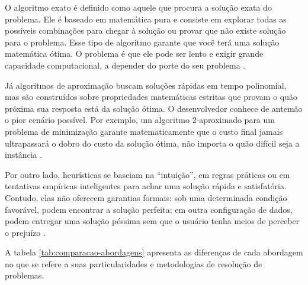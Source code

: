 O algoritmo exato é definido como aquele que procura a solução exata do problema. Ele é baseado em matemática pura e consiste em explorar todas as possíveis combinações para chegar à solução ou provar que não existe solução para o problema. Esse tipo de algoritmo garante que você terá uma solução matemática ótima. O problema é que ele pode ser lento e exigir grande capacidade computacional, a depender do porte do seu problema \cite{wikipedia_exact_alg}.

Já algoritmos de aproximação buscam soluções rápidas em tempo polinomial, mas são construídos sobre propriedades matemáticas estritas que provam o quão próxima sua resposta está da solução ótima. O desenvolvedor conhece de antemão o pior cenário possível. Por exemplo, um algoritmo 2-aproximado para um problema de minimização garante matematicamente que o custo final jamais ultrapassará o dobro do custo da solução ótima, não importa o quão difícil seja a instância \cite{fernandes2021}.

Por outro lado, heurísticas se baseiam na ``intuição'', em regras práticas ou em tentativas empíricas inteligentes para achar uma solução rápida e satisfatória. Contudo, elas não oferecem garantias formais: sob uma determinada condição favorável, podem encontrar a solução perfeita; em outra configuração de dados, podem entregar uma solução péssima sem que o usuário tenha meios de perceber o prejuízo \cite{sciencedirect_heuristic}.

A tabela \ref{tab:comparacao-abordagens} apresenta as diferenças de cada abordagem no que se refere a suas particularidades e metodologias de resolução de problemas.

